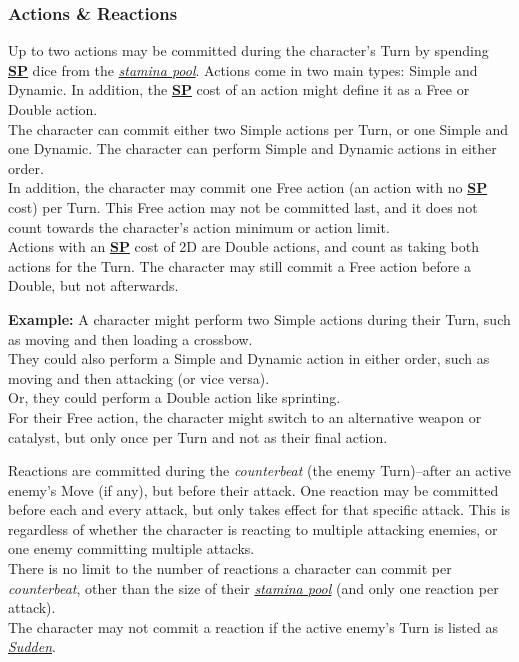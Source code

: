 \documentclass[12pt]{article}
\newcommand{\refto}[1]{\hyperlink{#1}{\textbf{#1}}}
\newcommand{\reftoit}[1]{\hyperlink{#1}{\emph{#1}}}
\begin{document}
\begin{multicols*}{2}
\subsubsection{Actions \& Reactions}
Up to two actions may be committed during the character’s Turn by spending \refto{SP} dice from the \reftoit{stamina pool}. Actions come in two main types: Simple and Dynamic. In addition, the \refto{SP} cost of an action might define it as a Free or Double action.\\
The character can commit either two Simple actions per Turn, or one Simple and one Dynamic. The character can perform Simple and Dynamic actions in either order.\\
In addition, the character may commit one Free action (an action with no \refto{SP} cost) per Turn. This Free action may not be committed last, and it does not count towards the character’s action minimum or action limit.\\
Actions with an \refto{SP} cost of 2D are Double actions, and count as taking both actions for the Turn. The character may still commit a Free action before a Double, but not afterwards.
\begin{tcolorbox}
\textbf{Example:} A character might perform two Simple actions during their Turn, such as moving and then loading a crossbow.\\
They could also perform a Simple and Dynamic action in either order, such as moving and then attacking (or vice versa).\\
Or, they could perform a Double action like sprinting.\\
For their Free action, the character might switch to an alternative weapon or catalyst, but only once per Turn and not as their final action.
\end{tcolorbox}
Reactions are committed during the \emph{counterbeat} (the enemy Turn)--after an active enemy’s Move (if any), but before their attack. One reaction may be committed before each and every attack, but only takes effect for that specific attack. This is regardless of whether the character is reacting to multiple attacking enemies, or one enemy committing multiple attacks.\\
There is no limit to the number of reactions a character can commit per \emph{counterbeat}, other than the size of their \reftoit{stamina pool} (and only one reaction per attack).\\
The character may not commit a reaction if the active enemy’s Turn is listed as \reftoit{Sudden}.\\


\end{multicols*}
\end{document}
